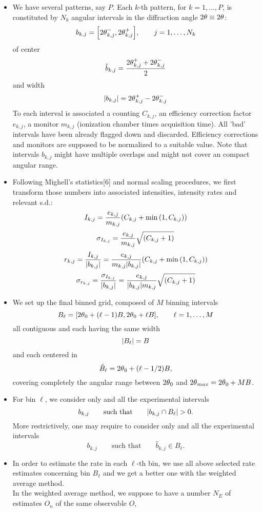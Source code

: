 \begin{itemize}
\item[1.\ ]{
We have several patterns, say $P$. Each $k$-th pattern, for $k=1,\ldots,P$, is
constituted by $N_k$ angular intervals in the diffraction angle $2\theta\equiv{\ensuremath{{2\theta}}}$:
\[
b_{k,j}={\left[{{{2\theta}}_{k,j}^{-},{{2\theta}}_{k,j}^{+}}\right]},\qquad j=1,\ldots,N_k
\]
of center
\[
\hat{b}_{k,j}={\displaystyle{\frac{{\ensuremath{\displaystyle{{\ensuremath{{2\theta}}}_{k,j}^{+}+{\ensuremath{{2\theta}}}_{k,j}^{-}}}}}{{\ensuremath{\displaystyle{2}}}}}}
\]
and width
\[
{\left|{b_{k,j}}\right|}={{2\theta}}_{k,j}^{+}-{{2\theta}}_{k,j}^{-}
\]
To each interval is associated a counting $C_{k,j}$, an efficiency correction factor $e_{k,j}$, a 
monitor $m_{k,j}$ (ionization chamber times acquisition time). All 'bad' intervals have been already flagged down and discarded.
Efficiency corrections and monitors are supposed to be normalized to a suitable value. 
Note that intervals $b_{k,j}$ might have multiple overlaps and might not cover an compact angular
range. }
%
\item[2.\ ]{Following Mighell's statistics[6] and normal scaling procedures, we first 
transform those numbers into associated intensities, intensity rates and relevant s.d.:
\[
I_{k,j}={\displaystyle{\frac{{\ensuremath{\displaystyle{e_{k,j}}}}}{{\ensuremath{\displaystyle{m_{k,j}}}}}}}{\left({C_{k,j}+\min{\ensuremath{\left({1,C_{k,j}}\right)}}}\right)}
\]
\[
\sigma_{I_{k,j}}={\displaystyle{\frac{{\ensuremath{\displaystyle{e_{k,j}}}}}{{\ensuremath{\displaystyle{m_{k,j}}}}}}}\sqrt{{\left({C_{k,j}+1}\right)}}
\]
\[
r_{k,j}={\displaystyle{\frac{{\ensuremath{\displaystyle{I_{k,j}}}}}{{\ensuremath{\displaystyle{{\ensuremath{\left|{b_{k,j}}\right|}}}}}}}}={\displaystyle{\frac{{\ensuremath{\displaystyle{e_{k,j}}}}}{{\ensuremath{\displaystyle{m_{k,j}{\ensuremath{\left|{b_{k,j}}\right|}}}}}}}}{\left({C_{k,j}+\min{\ensuremath{\left({1,C_{k,j}}\right)}}}\right)}
\]
\[
\sigma_{r_{k,j}}={\displaystyle{\frac{{\ensuremath{\displaystyle{\sigma_{I_{k,j}}}}}}{{\ensuremath{\displaystyle{{\ensuremath{\left|{b_{k,j}}\right|}}}}}}}}={\displaystyle{\frac{{\ensuremath{\displaystyle{e_{k,j}}}}}{{\ensuremath{\displaystyle{{\ensuremath{\left|{b_{k,j}}\right|}}m_{k,j}}}}}}}\sqrt{{\left({C_{k,j}+1}\right)}}
\]
 }
\item[3.\ ]{
We set up the final binned grid, 
composed of $M$ binning intervals
\[
B_\ell=[{{2\theta}}_0+(\ell-1)B, {{2\theta}}_0+\ell B],\qquad \ell=1,\ldots,M
\]
all contiguous and each having the same width \[{\left|{B_\ell}\right|}=B\] and each centered in 
\[\hat{B}_\ell={{2\theta}}_0+(\ell-1/2)B,\] 
covering completely the angular range between ${{2\theta}}_0$ and ${{2\theta}}_{max}={{2\theta}}_0+MB$.
}
\item[4.\ ]{
For bin $\ell$, we consider only and all the experimental intervals 
\[
b_{k,j}\qquad\text{such\ that}\qquad {\ensuremath{\left|{ b_{k,j}\cap B_\ell }\right|}} > 0.
\]
More restrictively, one may require to consider only and all the experimental intervals 
\[
b_{k,j}\qquad\text{such\ that}\qquad \hat{b}_{k,j}\in B_\ell .
\]
}
\item[5.\ ]{
In order to estimate the rate in each $\ell$-th bin, 
we use all above selected rate estimates concerning bin $B_\ell$ and we get
a better one with the weighted average method. \\
In the  weighted average method, we suppose to have a number $N_E$ of estimates $O_n$ 
of the same observable $O$, 
}
\end{itemize}
